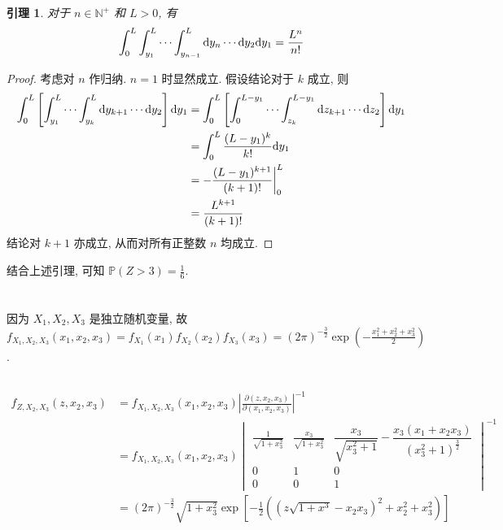 \documentclass[8pt]{article}
\theoremstyle{compact}
\newtheorem{lemma}{引理}
\def\P#1{\mathbb{P}\left({#1}\right)}
\begin{document}
\begin{lemma}
	对于 $n \in \mathbb N^+$ 和 $L > 0$, 有\begin{equation}
		\int_{0}^{L}\int_{y_1}^{L}\cdots\int_{y_{n-1}}^{L}\text dy_n\cdots\text dy_2\text dy_1 = \frac{L^n}{n!}
	\end{equation}
\end{lemma}
\begin{proof}
	考虑对 $n$ 作归纳. $n = 1$ 时显然成立. 假设结论对于 $k$ 成立, 则
	\begin{equation}
		\begin{split}
			\int_{0}^{L}\left[\int_{y_1}^{L}\cdots\int_{y_k}^{L}\text dy_{k+1}\cdots\text dy_2\right]\text dy_1 &= \int_{0}^{L}\left[\int_{0}^{L - y_1}\cdots\int_{z_k}^{L - y_1}\text dz_{k+1}\cdots\text dz_2\right]\text dy_1\\
			&= \int_{0}^{L}\frac{(L - y_1)^k}{k!}\text dy_1\\
			&= -\frac{(L - y_1)^{k+1}}{(k+1)!}\bigg|_{0}^{L}\\
			&= \frac{L^{k+1}}{(k+1)!}
		\end{split}
	\end{equation}
	结论对 $k + 1$ 亦成立, 从而对所有正整数 $n$ 均成立.
\end{proof}

结合上述引理, 可知 $\P{Z > 3} = \frac16$.

\section{}
\subsection{}
因为 $X_1, X_2, X_3$ 是独立随机变量, 故 $f_{X_1, X_2, X_3}(x_1, x_2, x_3) = f_{X_1}(x_1)f_{X_2}(x_2)f_{X_3}(x_3) = (2\pi)^{-\frac32}\exp\left(-\frac{x_1^2 + x_2^2 + x_3^2}{2}\right)$.
\subsection{}
\begin{equation}
	\begin{split}
		f_{Z, X_2, X_3}(z, x_2, x_3) &= f_{X_1, X_2, X_3}(x_1, x_2, x_3)\left|\frac{\partial(z, x_2, x_3)}{\partial(x_1, x_2, x_3)}\right|^{-1}\\
		&= f_{X_1, X_2, X_3}(x_1, x_2, x_3)\begin{vmatrix}
			\frac{1}{\sqrt{1 + x_3^2}} & \frac{x_3}{\sqrt{1 + x_3^2}} & \dfrac{x_3}{\sqrt{x_3^2+1}}-\dfrac{x_3\left(x_1+x_2x_3\right)}{\left(x_3^2+1\right)^\frac{3}{2}}\\
			0&1&0\\0&0&1
		\end{vmatrix}^{-1}\\
		&= (2\pi)^{-\frac32}\sqrt{1+x_3^2}\exp\left[-\frac12\left(\left(z\sqrt{1+x^3}-x_2x_3\right)^2+x_2^2+x_3^2\right)\right]
	\end{split}
\end{equation}
\end{document}
